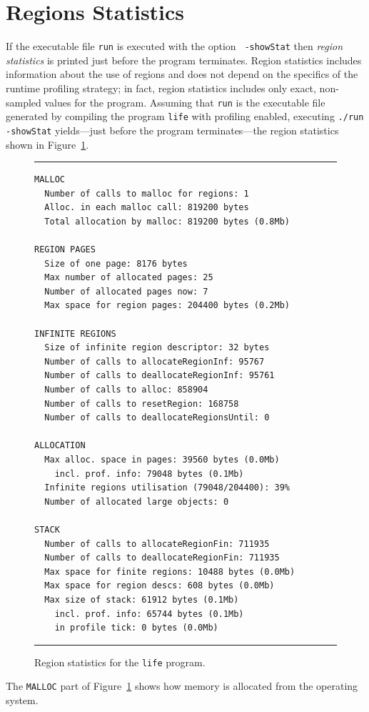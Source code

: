 \documentclass[12pt]{book}
\begin{document}
\section{Regions Statistics}
If the executable file {\tt run} is executed with the option {\tt
  -showStat} then
%
{\em region statistics\/} is printed just before the program
terminates. Region statistics includes information about the use of
regions and does not depend on the specifics of the runtime profiling
strategy; in fact, region statistics includes only exact, non-sampled
values for the program. Assuming that {\tt run} is the executable file
generated by compiling the program {\tt life} with profiling enabled,
executing {\tt ./run -showStat} yields---just before the program
terminates---the region statistics shown in
Figure~\ref{region_statistics.fig}.
\begin{figure}
\hrule \medskip
\begin{verbatim}
MALLOC
  Number of calls to malloc for regions: 1
  Alloc. in each malloc call: 819200 bytes
  Total allocation by malloc: 819200 bytes (0.8Mb)

REGION PAGES
  Size of one page: 8176 bytes
  Max number of allocated pages: 25
  Number of allocated pages now: 7
  Max space for region pages: 204400 bytes (0.2Mb)

INFINITE REGIONS
  Size of infinite region descriptor: 32 bytes
  Number of calls to allocateRegionInf: 95767
  Number of calls to deallocateRegionInf: 95761
  Number of calls to alloc: 858904
  Number of calls to resetRegion: 168758
  Number of calls to deallocateRegionsUntil: 0

ALLOCATION
  Max alloc. space in pages: 39560 bytes (0.0Mb)
    incl. prof. info: 79048 bytes (0.1Mb)
  Infinite regions utilisation (79048/204400): 39%
  Number of allocated large objects: 0

STACK
  Number of calls to allocateRegionFin: 711935
  Number of calls to deallocateRegionFin: 711935
  Max space for finite regions: 10488 bytes (0.0Mb)
  Max space for region descs: 608 bytes (0.0Mb)
  Max size of stack: 61912 bytes (0.1Mb)
    incl. prof. info: 65744 bytes (0.1Mb)
    in profile tick: 0 bytes (0.0Mb)
\end{verbatim}
\caption{Region statistics for the {\tt life} program.}
\label{region_statistics.fig}
\medskip\hrule
\end{figure}

The {\tt MALLOC} part of Figure~\ref{region_statistics.fig} shows how
memory is allocated from the operating system.
\end{document}
